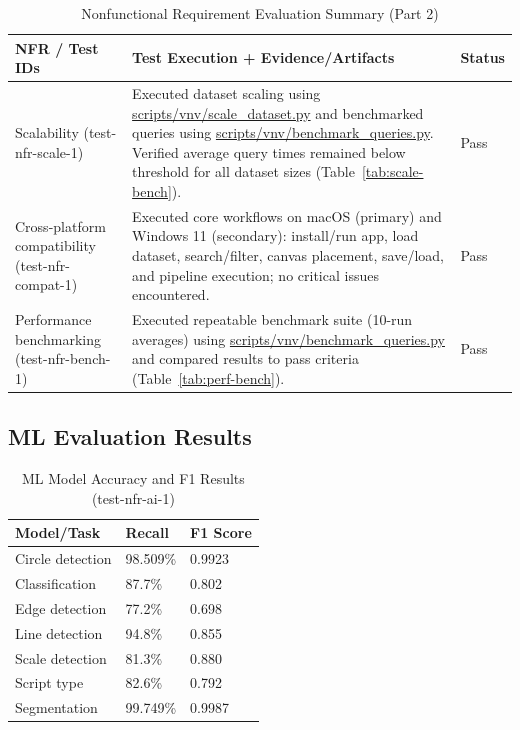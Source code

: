 \documentclass[12pt, titlepage]{article}
\begin{document}
\begin{table}[H]
\centering
\caption{Nonfunctional Requirement Evaluation Summary (Part 2)}
\label{tab:nfr-eval-2}
\begin{tabularx}{\textwidth}{
>{\raggedright\arraybackslash}p{3.2cm}
>{\raggedright\arraybackslash}p{7.1cm}
p{2cm}
}
\toprule
\textbf{NFR / Test IDs} & \textbf{Test Execution + Evidence/Artifacts} & \textbf{Status}\\
\midrule

Scalability (test-nfr-scale-1) &
Executed dataset scaling using \url{scripts/vnv/scale_dataset.py} and benchmarked queries using \url{scripts/vnv/benchmark_queries.py}. Verified average query times remained below threshold for all dataset sizes (Table~\ref{tab:scale-bench}). &
Pass\\

Cross-platform compatibility (test-nfr-compat-1) &
Executed core workflows on macOS (primary) and Windows 11 (secondary): install/run app, load dataset, search/filter, canvas placement, save/load, and pipeline execution; no critical issues encountered. &
Pass\\

Performance benchmarking (test-nfr-bench-1) &
Executed repeatable benchmark suite (10-run averages) using \url{scripts/vnv/benchmark_queries.py} and compared results to pass criteria (Table~\ref{tab:perf-bench}). &
Pass\\

\bottomrule
\end{tabularx}
\end{table}

\subsection{ML Evaluation Results}

\begin{table}[H]
\centering
\caption{ML Model Accuracy and F1 Results (test-nfr-ai-1)}
\label{tab:ml-metrics}
\begin{tabularx}{\textwidth}{p{4.0cm}p{4.0cm}p{4.0cm}}
\toprule
\textbf{Model/Task} & \textbf{Recall} & \textbf{F1 Score}\\
\midrule
Circle detection & 98.509\% & 0.9923\\
Classification & 87.7\% & 0.802\\
Edge detection & 77.2\% & 0.698\\
Line detection & 94.8\% & 0.855\\
Scale detection & 81.3\% & 0.880\\
Script type & 82.6\% & 0.792\\
Segmentation & 99.749\% & 0.9987\\
\bottomrule
\end{tabularx}
\end{table}
\end{document}
